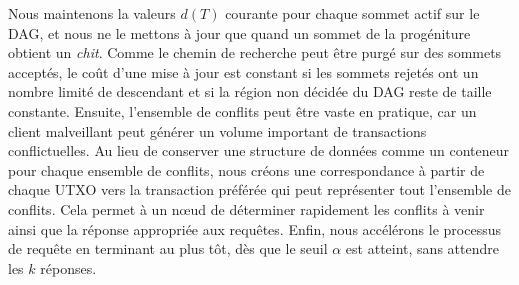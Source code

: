 \documentclass[a4,twocolumn,10pt]{article}
\theoremstyle{definition}
\begin{document}
Nous maintenons la valeurs $d(T)$ courante pour chaque sommet actif sur le DAG, et nous ne le mettons à jour que quand un sommet de la progéniture obtient un \emph{chit}.
Comme le chemin de recherche peut être purgé sur des sommets acceptés, le coût d'une mise à jour est constant si les sommets rejetés ont un nombre limité de descendant et si la région non décidée du DAG reste de taille constante.
Ensuite, l'ensemble de conflits peut être vaste en pratique, car un client malveillant peut générer un volume important de transactions conflictuelles.
Au lieu de conserver une structure de données comme un conteneur pour chaque ensemble de conflits, nous créons une correspondance à partir de chaque UTXO vers la transaction préférée qui peut représenter tout l'ensemble de conflits.
Cela permet à un nœud de déterminer rapidement les conflits à venir ainsi que la réponse appropriée aux requêtes.
Enfin, nous accélérons le processus de requête en terminant au plus tôt, dès que le seuil $\alpha$ est atteint, sans attendre les $k$ réponses.


\end{document}

